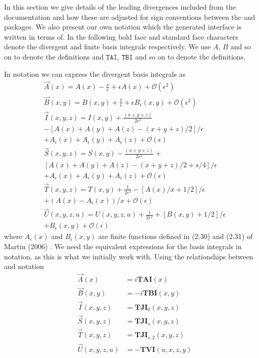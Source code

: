 In this section we give details of the leading divergences included from the \tsil documentation and how these are adjusted for sign conventions between the \tarcer and \tsil packages.  We also present our own notation which the generated \tsil interface is written in terms of.  In the following bold face and standard face characters denote the divergent and finite basis integrals respectively.  We use $A$, $B$ and so on to denote the \tsil definitions and $\mathtt{TAI}$, $\mathtt{TBI}$ and so on to denote the \tarcer definitions.  


In \tsil notation we can express the divergent basis integrals as \cite{Martin2006}
\begin{align*}
&\vec{A}(x) = A(x) -\frac{x}{\epsilon} +\epsilon A(x) +\mathcal{O}(\epsilon^2) \\
&\vec{B}(x,y)= B(x,y) +\frac{1}{\epsilon} +\epsilon B_{\epsilon}(x,y) +\mathcal{O}(\epsilon^2) \\
&\vec{I}(x,y,z)= I(x,y) +\frac{(x+y+z)}{2\epsilon^2}  \\ &- \left[A(x)+A(y)+A(z)-(x+y+z)/2\right]/\epsilon\\ &+ A_{\epsilon}(x)+ A_{\epsilon}(y)+ A_{\epsilon}(z)+\mathcal{O}(\epsilon) \\
&\vec{S}(x,y,z)= S(x,y) -\frac{(x+y+z)}{2\epsilon^2} + \\ & \left[A(x)+A(y)+A(z)-(x+y+z)/2+s/4\right]/\epsilon\\ &+ A_{\epsilon}(x)+ A_{\epsilon}(y)+ A_{\epsilon}(z)+\mathcal{O}(\epsilon) \\
&\vec{T}(x,y,z)= T(x,y) +\frac{1}{2\epsilon^2} -\left[A(x)/x +1/2\right]/\epsilon\\ &+ (A(x)- A_{\epsilon}(x))/x+\mathcal{O}(\epsilon) \\
&\vec{U}(x,y,z,u)= U(x,y,z,u) +\frac{1}{2\epsilon^2} +\left[B(x,y) +1/2\right]/\epsilon\\ &+ B_{\epsilon}(x,y)+\mathcal{O}(\epsilon)
\end{align*}
where $A_{\epsilon}(x)$ and $B_{\epsilon}(x,y)$ are finite functions defined in (2.30) and (2.31) of Martin (2006) \cite{Martin2006}.  We need the equivalent expressions for the basis integrals in \tarcer notation, as this is what we initially work with.  Using the relationships between \tsil and \tarcer notation \cite{Martin2006}
\begin{eqnarray*}
&\vec{A}(x) &=i \mathtt{\mathbf{TAI}}(x)\\
&\vec{B}(x,y) &=-i \mathtt{\mathbf{TBI}}(x,y)\\
&\vec{I}(x,y,z)&=\mathtt{\mathbf{TJI}}_0(x,y,z)\\
&\vec{S}(x,y,z)&=\mathtt{\mathbf{TJI}}_s(x,y,z)\\
&\vec{T}(x,y,z)&=\mathtt{\mathbf{TJI}}_{s,2}(x,y,z)\\
&\vec{U}(x,y,z,u)&=-\mathtt{\mathbf{TVI}}(u,x,z,y)
\end{eqnarray*}
